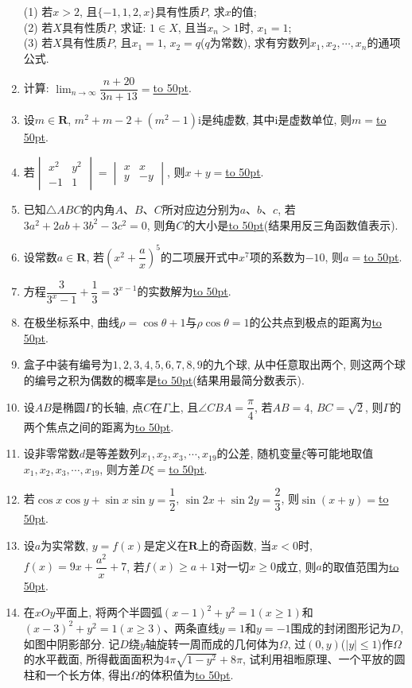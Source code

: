 \documentclass[10pt,a4paper]{article}
\newcommand{\blank}[1]{\underline{\hbox to #1pt{}}}
\begin{document}
\begin{enumerate}[1.]
(1) 若$x>2$, 且$\{-1,1,2,x\}$具有性质$P$, 求$x$的值;\\
(2) 若$X$具有性质$P$, 求证: $1\in X$, 且当$x_n>1$时, $x_1=1$;\\
(3) 若$X$具有性质$P$, 且$x_1=1$, $x_2=q$($q$为常数), 求有穷数列$x_1,x_2,\cdots,x_n$的通项公式.
\item 计算: $\displaystyle\lim_{n\to\infty} \dfrac{n+20}{3n+13}=$\blank{50}.
\item 设$m\in \mathbf{R}$, $m^2+m-2+(m^2-1)\mathrm{i}$是纯虚数, 其中$\mathrm{i}$是虚数单位, 则$m=$\blank{50}.
\item 若$\begin{vmatrix}
x^2 & y^2  \\-1 & 1  \end{vmatrix}=\begin{vmatrix}
x & x  \\y & -y  \end{vmatrix}$, 则$x+y=$\blank{50}.
\item 已知$\triangle ABC$的内角$A$、$B$、$C$所对应边分别为$a$、$b$、$c$, 若$3a^2+2ab+3b^2-3c^2=0$, 则角$C$的大小是\blank{50}(结果用反三角函数值表示).
\item 设常数$a\in \mathbf{R}$, 若$(x^2+\dfrac ax)^5$的二项展开式中$x^7$项的系数为$-10$, 则$a=$\blank{50}.
\item 方程$\dfrac 3{3^x-1}+\dfrac 13=3^{x-1}$的实数解为\blank{50}.
\item 在极坐标系中, 曲线$\rho =\cos \theta +1$与$\rho \cos \theta =1$的公共点到极点的距离为\blank{50}.
\item 盒子中装有编号为$1, 2, 3, 4, 5, 6, 7, 8, 9$的九个球, 从中任意取出两个, 则这两个球的编号之积为偶数的概率是\blank{50}(结果用最简分数表示).
\item 设$AB$是椭圆$\Gamma$的长轴, 点$C$在$\Gamma$上, 且$\angle CBA=\dfrac{\pi}4$, 若$AB=4$, $BC=\sqrt 2$, 则$\Gamma$的两个焦点之间的距离为\blank{50}.
\item 设非零常数$d$是等差数列$x_1,x_2,x_3,\cdots ,x_{19}$的公差, 随机变量$\xi$等可能地取值$x_1,x_2,x_3,\cdots ,x_{19}$, 则方差$D\xi =$\blank{50}.
\item 若$\cos x\cos y+\sin x\sin y=\dfrac 12$, $\sin 2x+\sin 2y=\dfrac 23$, 则$\sin (x+y)=$\blank{50}.
\item 设$a$为实常数, $y=f(x)$是定义在$\mathbf{R}$上的奇函数, 当$x<0$时, $f(x)=9x+\dfrac{a^2}x+7$, 若$f(x)\ge a+1$对一切$x\ge 0$成立, 则$a$的取值范围为\blank{50}.
\item 在$xOy$平面上, 将两个半圆弧$(x-1)^2+y^2=1(x\ge 1)$和$(x-3)^2+y^2=1(x\ge 3)$、两条直线$y=1$和$y=-1$围成的封闭图形记为$D$, 如图中阴影部分. 记$D$绕$y$轴旋转一周而成的几何体为$\Omega$, 过$(0,y)$($|y|\le 1$)作$\Omega$的水平截面, 所得截面面积为$4\pi \sqrt {1-y^2}+8\pi$, 试利用祖暅原理、一个平放的圆柱和一个长方体, 得出$\Omega$的体积值为\blank{50}.

\end{enumerate}
\end{document}
